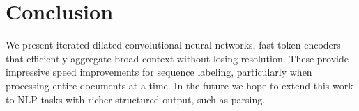 \documentclass[11pt,letterpaper]{article}
\begin{document}
\begin{abstract}

\end{abstract}













\section{Conclusion}

We present iterated dilated convolutional neural networks, fast token encoders that efficiently aggregate broad context without losing resolution. These provide impressive speed improvements for sequence labeling, particularly when processing entire documents at a time. In the future we hope to extend this work to NLP tasks with richer structured output, such as parsing.
\end{document}

